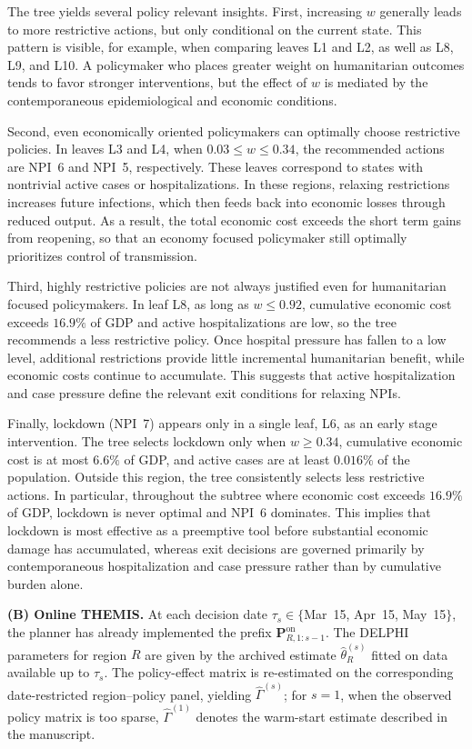 \documentclass[letterpaper,twoside,11pt]{reviewresponse}
\begin{document}
The tree yields several policy relevant insights. First, increasing $w$ generally leads to more restrictive actions, but only conditional on the current state. This pattern is visible, for example, when comparing leaves L1 and L2, as well as L8, L9, and L10. A policymaker who places greater weight on humanitarian outcomes tends to favor stronger interventions, but the effect of $w$ is mediated by the contemporaneous epidemiological and economic conditions.

Second, even economically oriented policymakers can optimally choose restrictive policies. In leaves L3 and L4, when $0.03 \leq w \leq 0.34$, the recommended actions are NPI~6 and NPI~5, respectively. These leaves correspond to states with nontrivial active cases or hospitalizations. In these regions, relaxing restrictions increases future infections, which then feeds back into economic losses through reduced output. As a result, the total economic cost exceeds the short term gains from reopening, so that an economy focused policymaker still optimally prioritizes control of transmission.

Third, highly restrictive policies are not always justified even for humanitarian focused policymakers. In leaf L8, as long as $w \leq 0.92$, cumulative economic cost exceeds $16.9\%$ of GDP and active hospitalizations are low, so the tree recommends a less restrictive policy. Once hospital pressure has fallen to a low level, additional restrictions provide little incremental humanitarian benefit, while economic costs continue to accumulate. This suggests that active hospitalization and case pressure define the relevant exit conditions for relaxing NPIs.

Finally, lockdown (NPI~7) appears only in a single leaf, L6, as an early stage intervention. The tree selects lockdown only when $w \geq 0.34$, cumulative economic cost is at most $6.6\%$ of GDP, and active cases are at least $0.016\%$ of the population. Outside this region, the tree consistently selects less restrictive actions. In particular, throughout the subtree where economic cost exceeds $16.9\%$ of GDP, lockdown is never optimal and NPI~6 dominates. This implies that lockdown is most effective as a preemptive tool before substantial economic damage has accumulated, whereas exit decisions are governed primarily by contemporaneous hospitalization and case pressure rather than by cumulative burden alone.

\textbf{(B) Online THEMIS.} At each decision date $\tau_s\in\{$Mar~15, Apr~15, May~15$\}$, the planner has already implemented the prefix $\bm{P}_{R,1:s-1}^{\mathrm{on}}$. The DELPHI parameters for region $R$ are given by the archived estimate $\hat{\theta}_R^{(s)}$ fitted on data available up to $\tau_s$. The policy-effect matrix is re-estimated on the corresponding date-restricted region--policy panel, yielding $\hat{\Gamma}^{(s)}$; for $s=1$, when the observed policy matrix is too sparse, $\hat{\Gamma}^{(1)}$ denotes the warm-start estimate described in the manuscript.
\end{document}
